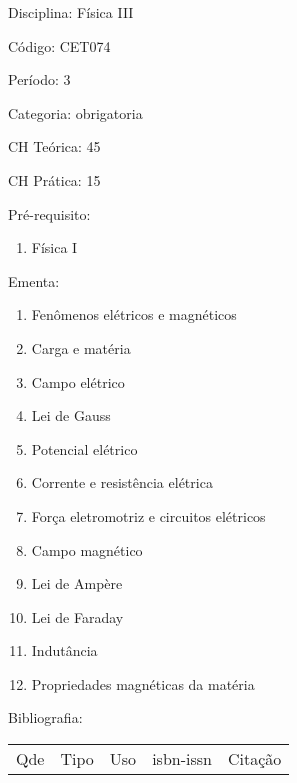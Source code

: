 \documentclass[12pt,a4paper,twoside]{report}
\begin{document}
Disciplina: Física III

Código: CET074

Período: 3

Categoria: obrigatoria

CH Teórica: 45

CH Prática: 15




Pré-requisito:
\begin{enumerate}
\item Física I
\end{enumerate}

Ementa:
\begin{enumerate}
\item Fenômenos elétricos e magnéticos
\item Carga e matéria
\item Campo elétrico
\item Lei de Gauss
\item Potencial elétrico
\item Corrente e resistência elétrica
\item Força eletromotriz e circuitos elétricos
\item Campo magnético
\item Lei de Ampère
\item Lei de Faraday
\item Indutância
\item Propriedades magnéticas da matéria
\end{enumerate}



Bibliografia:


\begin{tabular}{llllp{8cm}}
Qde & Tipo & Uso & isbn-issn & Citação \\
\end{tabular}
\end{document}
